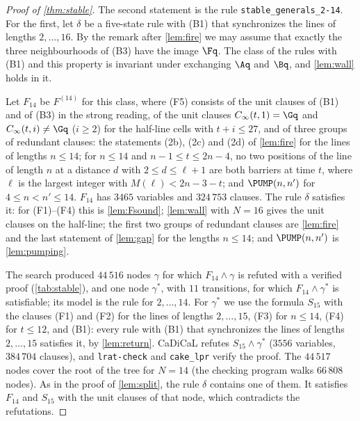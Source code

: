 \begin{proof}[Proof of \cref{thm:stable}]
The second statement is the rule \texttt{stable\_generals\_2-14}. For the first,
let $\delta$ be a five-state rule with (B1) that synchronizes the lines of
lengths $2,\dots,16$. By the remark after \cref{lem:fire} we may assume that
exactly the three neighbourhoods of (B3) have the image $\Fq$. The class of the
rules with (B1) and this property is invariant under exchanging $\Aq$ and
$\Bq$, and \cref{lem:wall} holds in it.

Let $F_{14}$ be $F^{(14)}$ for this class, where (F5) consists of the unit
clauses of (B1) and of (B3) in the strong reading, of the unit clauses
$C_\infty(t,1)=\Gq$ and $C_\infty(t,i)\ne\Gq$ ($i\ge2$) for the half-line cells
with $t+i\le27$, and of three groups of redundant clauses: the statements (2b),
(2c) and (2d) of \cref{lem:fire} for the lines of lengths $n\le14$; for
$n\le14$ and $n-1\le t\le2n-4$, no two positions of the line of length $n$ at a
distance $d$ with $2\le d\le\ell+1$ are both barriers at time $t$, where $\ell$
is the largest integer with $M(\ell)<2n-3-t$; and $\PUMP(n,n')$ for
$4\le n<n'\le14$. $F_{14}$ has
$3465$ variables and $324\,753$ clauses. The rule $\delta$ satisfies it: for
(F1)--(F4) this is \cref{lem:Fsound}; \cref{lem:wall} with $N=16$ gives the unit
clauses on the half-line; the first two groups of redundant clauses are \cref{lem:fire} and the last
statement of \cref{lem:gap} for the lengths $n\le14$; and $\PUMP(n,n')$ is
\cref{lem:pumping}.

The search produced $44\,516$ nodes $\gamma$ for which $F_{14}\wedge\gamma$ is
refuted with a verified proof (\cref{tab:stable}), and one node $\gamma^\ast$,
with $11$ transitions, for which $F_{14}\wedge\gamma^\ast$ is satisfiable; its
model is the rule for $2,\dots,14$. For $\gamma^\ast$ we use the formula
$S_{15}$ with the clauses (F1) and (F2) for the lines of lengths
$2,\dots,15$, (F3) for $n\le14$, (F4) for $t\le12$, and (B1): every rule with
(B1) that synchronizes the lines of lengths $2,\dots,15$ satisfies it, by
\cref{lem:return}. CaDiCaL refutes $S_{15}\wedge\gamma^\ast$ ($3556$ variables,
$384\,704$ clauses), and \texttt{lrat-check} and \texttt{cake\_lpr} verify the
proof. The $44\,517$ nodes cover the root of the tree for $N=14$ (the checking
program walks $66\,808$ nodes). As in the proof of \cref{lem:split}, the rule
$\delta$ contains one of them. It satisfies $F_{14}$ and $S_{15}$ with the unit
clauses of that node, which contradicts the refutations.
\end{proof}

